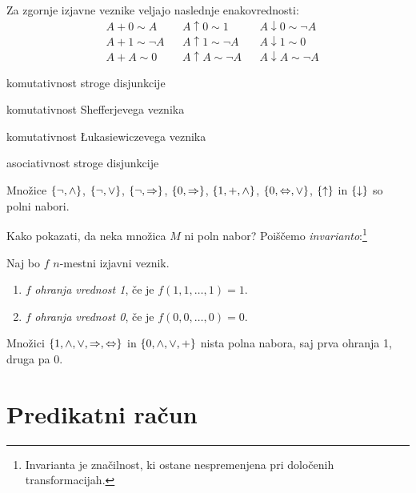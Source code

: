 \documentclass[12pt, a4paper]{article}
\renewcommand{\implies}{\Rightarrow}
\renewcommand{\iff}{\Leftrightarrow}
\begin{document}
Za zgornje izjavne veznike veljajo naslednje enakovrednosti:
\begin{align*}
& A+0\sim A     && A\uparrow 0\sim 1     && A\downarrow 0\sim\neg A \\
& A+1\sim\neg A && A\uparrow 1\sim\neg A && A\downarrow 1\sim 0     \\
& A+A\sim 0     && A\uparrow A\sim\neg A && A\downarrow A\sim\neg A
\end{align*}
\begin{description}[align=left, labelwidth=\widthof{$A+(B+C)\sim(A+B)+CAA$}]
\item[$A+B\sim B+A$] komutativnost stroge disjunkcije
\item[$A\uparrow B\sim B\uparrow A$] komutativnost Shefferjevega veznika
\item[$A\downarrow B\sim B\downarrow A$] komutativnost Łukasiewiczevega veznika
\item[$A+(B+C)\sim(A+B)+C$] asociativnost stroge disjunkcije
\end{description}

\begin{trditev}
Množice $\left\{\neg,\land\right\}$, $\left\{\neg,\lor\right\}$, $\set{\neg,\implies}$, $\set{0,\implies}$, $\left\{1,+,\land\right\}$, $\set{0,\iff,\lor}$, $\left\{\uparrow\right\}$ in $\left\{\downarrow\right\}$ so polni nabori.
\end{trditev}

\obvs

Kako pokazati, da neka množica $M$ ni poln nabor? Poiščemo \emph{invarianto}:\footnote{Invarianta je značilnost, ki ostane nespremenjena pri določenih transformacijah.}

\begin{definicija}
Naj bo $f$ $n$-mestni izjavni veznik.

\begin{enumerate}
\item $f$ \emph{ohranja vrednost 1}, če je $f(1,1,\dots,1)=1$.
\item $f$ \emph{ohranja vrednost 0}, če je $f(0,0,\dots,0)=0$.
\end{enumerate}
\end{definicija}

\begin{zgled}
Množici $\set{1,\land,\lor,\implies,\iff}$ in $\left\{0,\land,\lor,+\right\}$ nista polna nabora, saj prva ohranja 1, druga pa 0.
\end{zgled}

\newpage

\section{Predikatni račun}
\end{document}
